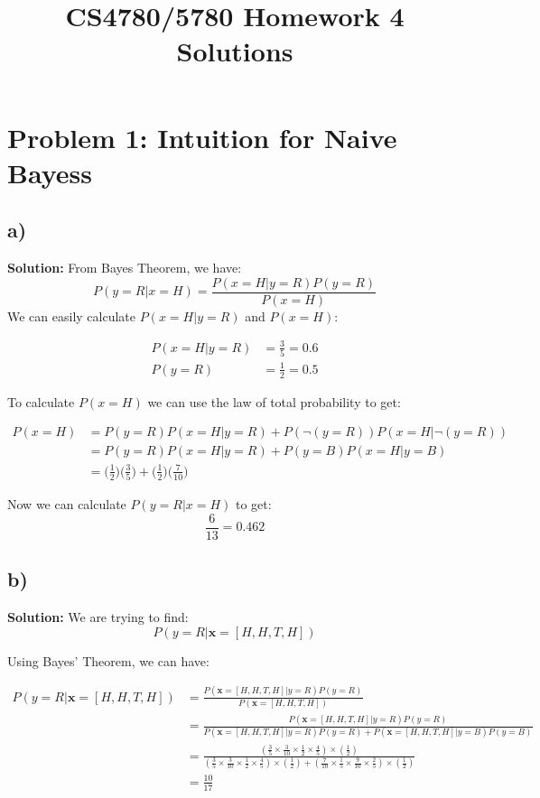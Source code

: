 \documentclass[11pt]{article}
\title{CS4780/5780 Homework 4 Solutions}
\begin{document}
	\maketitle
	\section*{Problem 1: Intuition for Naive Bayess}
		\subsection*{a)}
		\textbf{Solution:}
		From Bayes Theorem, we have: $${P(y = R|x = H)} = \frac{P(x = H|y = R)P(y = R)}{P(x = H)}$$We can easily calculate $P(x = H|y = R)$ and $P(x = H)$: 

		\begin{align*}
			P(x = H|y = R) &= \frac{3}{5}  = 0.6\\
			P(y = R) &= \frac{1}{2} = 0.5
		\end{align*}

		To calculate $P(x = H)$ we can use the law of total probability to get:

		\begin{align*}
			P(x = H) &= P(y = R)P(x = H|y = R) + P(\neg (y = R))P(x = H|\neg (y = R))\\
			&= P(y = R)P(x = H|y = R) + P(y = B)P(x = H|y = B)\\ 
			&= \Big(\frac{1}{2}\Big)\Big(\frac{3}{5}\Big) + \Big(\frac{1}{2}\Big)\Big(\frac{7}{10}\Big)
		\end{align*}


		Now we can calculate $P(y = R|x = H)$ to get: $$ \frac{6}{13} = 0.462$$

		\subsection*{b)}
		\textbf{Solution:}
		We are trying to find: 
		$$P(y = R | \mathbf{x} = [H,H,T,H])$$

		Using Bayes' Theorem, we can have: 

		\begin{align*}
			P(y = R|\mathbf{x} = [H,H,T,H]) &= \frac{P(\mathbf{x} = [H,H,T,H] | y = R) P(y=R)}{P(\mathbf{x} = [H,H,T,H])} \\
			&= \frac{P(\mathbf{x} = [H,H,T,H] | y = R) P(y=R)}{P(\mathbf{x} = [H,H,T,H] | y = R) P(y=R) + P(\mathbf{x} = [H,H,T,H] | y = B) P(y=B)} \\
     			&= \frac{(\frac{3}{5} \times \frac{3}{10} \times \frac{1}{2} \times \frac{4}{5}) \times (\frac{1}{2})}{(\frac{3}{5} \times \frac{3}{10} \times \frac{1}{2} \times \frac{4}{5})  \times (\frac{1}{2}) + (\frac{7}{10} \times \frac{1}{5}
     \times \frac{9}{10} \times \frac{2}{5})  \times (\frac{1}{2}) } \\
     			&= \frac{10}{17}
		\end{align*}
		
\end{document}
